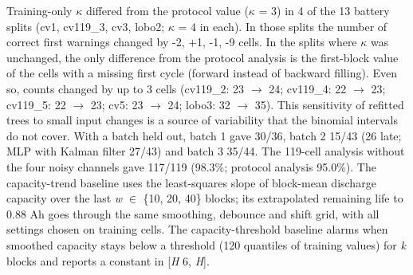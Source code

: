 \documentclass[11pt,a4paper]{article}
\begin{document}
\noindent Training-only $\kappa$ differed from the protocol value ($\kappa$ = 3) in 4 of the 13 battery splits (cv1, cv119\_3, cv3, lobo2; $\kappa$ = 4 in each). In those splits the number of correct first warnings changed by -2, +1, -1, -9 cells. In the splits where $\kappa$ was unchanged, the only difference from the protocol analysis is the first-block value of the cells with a missing first cycle (forward instead of backward filling). Even so, counts changed by up to 3 cells (cv119\_2: 23 $\rightarrow$ 24; cv119\_4: 22 $\rightarrow$ 23; cv119\_5: 22 $\rightarrow$ 23; cv5: 23 $\rightarrow$ 24; lobo3: 32 $\rightarrow$ 35). This sensitivity of refitted trees to small input changes is a source of variability that the binomial intervals do not cover. With a batch held out, batch 1 gave 30/36, batch 2 15/43 (26 late; MLP with Kalman filter 27/43) and batch 3 35/44. The 119-cell analysis without the four noisy channels gave 117/119 (98.3\%; protocol analysis 95.0\%). The capacity-trend baseline uses the least-squares slope of block-mean discharge capacity over the last \textit{w} $\in$ \{10, 20, 40\} blocks; its extrapolated remaining life to 0.88 Ah goes through the same smoothing, debounce and shift grid, with all settings chosen on training cells. The capacity-threshold baseline alarms when smoothed capacity stays below a threshold (120 quantiles of training values) for \textit{k} blocks and reports a constant in [\textit{H} \textminus{} 6, \textit{H}].
\end{document}

